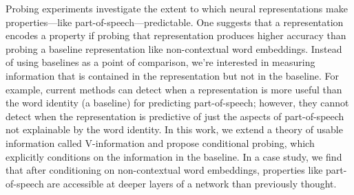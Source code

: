 Probing experiments investigate the extent to which neural representations make properties—like part-of-speech—predictable. One suggests that a representation encodes a property if probing that representation produces higher accuracy than probing a baseline representation like non-contextual word embeddings. Instead of using baselines as a point of comparison, we're interested in measuring information that is contained in the representation but not in the baseline. For example, current methods can detect when a representation is more useful than the word identity (a baseline) for predicting part-of-speech; however, they cannot detect when the representation is predictive of just the aspects of part-of-speech not explainable by the word identity. In this work, we extend a theory of usable information called V-information and propose conditional probing, which explicitly conditions on the information in the baseline. In a case study, we find that after conditioning on non-contextual word embeddings, properties like part-of-speech are accessible at deeper layers of a network than previously thought.
